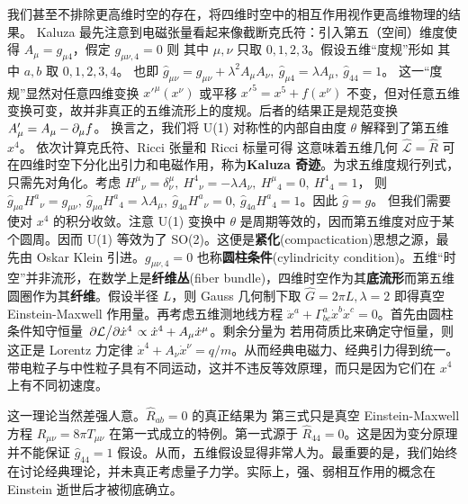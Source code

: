 我们甚至不排除更高维时空的存在，将四维时空中的相互作用视作更高维物理的结果。
Kaluza 最先注意到电磁张量看起来像截断克氏符：引入第五（空间）维度使得 $A_{\mu}=g_{\mu 4}$，假定 $g_{\mu\nu,4}=0$ 则
其中 $\mu,\nu$ 只取 $0,1,2,3$。假设五维“度规”形如
其中 $a,b$ 取 $0,1,2,3,4$。
也即
$\hat g_{\mu\nu}=g_{\mu\nu}+\lambda^2 A_{\mu}A_{\nu},\ \hat g_{\mu 4}=\lambda A_\mu,\ \hat g_{44}=1$。
这一“度规”显然对任意四维变换 $x'^\mu(x^\nu)$ 或平移 $x'^5=x^5+f(x^\nu)$ 不变，但对任意五维变换可变，故并非真正的五维流形上的度规。后者的结果正是规范变换 $A'_\mu=A_\mu-\partial_\mu f$。
换言之，我们将 U(1) 对称性的内部自由度 $\theta$ 解释到了第五维 $x^4$。
依次计算克氏符、Ricci 张量和 Ricci 标量可得
这意味着五维几何 $\hat{\mathcal L}=\hat R$ 可在四维时空下分化出引力和电磁作用，称为\textbf{Kaluza 奇迹}。为求五维度规行列式，只需先对角化。考虑
$H^\mu{}_{\nu}=\delta^\mu_\nu,\ H^4{}_{\nu}=-\lambda A_\nu,\ H^\mu{}_{4}=0,\ H^4{}_{4}=1$，
则 $\hat g_{\mu a} H^a{}_{\nu}=g_{\mu\nu},\ \hat g_{\mu a} H^a{}_{4}=\lambda A_\mu,\ \hat g_{4 a} H^a{}_{\nu}=0,\ \hat g_{4 a} H^a{}_{4}=1$。因此 $\hat g=g$。
但我们需要使对 $x^4$ 的积分收敛。注意 U(1) 变换中 $\theta$ 是周期等效的，因而第五维度对应于某个圆周。因而 U(1) 等效为了 SO(2)。这便是\textbf{紧化}(compactication)思想之源，最先由 Oskar Klein 引进。$g_{\mu\nu,4}=0$ 也称\textbf{圆柱条件}(cylindricity condition)。五维“时空”并非流形，在数学上是\textbf{纤维丛}(fiber bundle)，四维时空作为其\textbf{底流形}而第五维圆圈作为其\textbf{纤维}。假设半径 $L$，则
Gauss 几何制下取 $\hat G=2\pi L,\lambda=2$ 即得真空 Einstein-Maxwell 作用量。再考虑五维测地线方程 $\ddot x^a+\Gamma^a_{bc}\dot x^b \dot x^c=0$。首先由圆柱条件知守恒量 $\pdv*{\mathcal L}{\dot x^4}\propto\dot x^4+A_\mu\dot x^\mu$。剩余分量为
若用荷质比来确定守恒量，则这正是 Lorentz 力定律 $\dot x^4+A_\nu\dot x^\nu=q/m$。从而经典电磁力、经典引力得到统一。
带电粒子与中性粒子具有不同运动，这并不违反等效原理，而只是因为它们在 $x^4$ 上有不同初速度。

这一理论当然差强人意。$\hat R_{ab}=0$ 的真正结果为
第三式只是真空 Einstein-Maxwell 方程 $R_{\mu\nu}=8\pi T_{\mu\nu}$ 在第一式成立的特例。第一式源于 $\hat R_{44}=0$。这是因为变分原理并不能保证 $\hat g_{44}=1$ 假设。从而，五维假设显得非常人为。最重要的是，我们始终在讨论经典理论，并未真正考虑量子力学。实际上，强、弱相互作用的概念在 Einstein 逝世后才被彻底确立。

